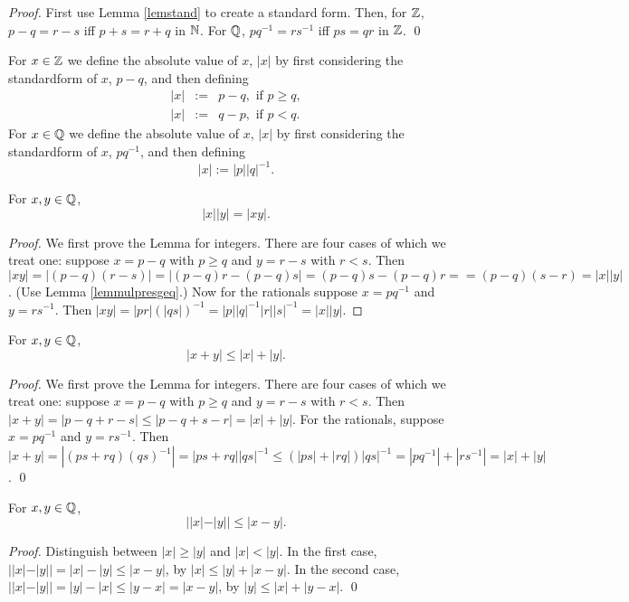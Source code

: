 {\begin{proof}
First use Lemma \ref{lemstand} to create a standard form. Then, for $\mathbb{Z}$,
$p-q = r-s$ iff $p+s = r+q$ in $\mathbb{N}$.
For $\mathbb{Q}$, $p   q^{-1} = r  s^{-1}$ iff $p   s = q   r$ in $\mathbb{Z}$. \qed
\end{proof}

\begin{definition}\label{defabszq}
For $x\in\mathbb{Z}$ we define the absolute value of $x$, $|x|$ by first
considering the standardform of $x$, $p-q$, and then defining
\begin{eqnarray*} 
|x|&:=& p-q, \mbox{ if } p\geq q,\\
|x| &:=& q-p, \mbox{ if } p< q.
\end{eqnarray*}
For $x\in\mathbb{Q}$ we define the absolute value of $x$, $|x|$ by first
considering the standardform of $x$, $p q^{-1}$, and then defining
$$|x|:= |p| |q|^{-1}.$$
\end{definition}

\begin{lemma}\label{lemmulabsval}
For $x, y \in \mathbb{Q}$,
$$ |x| |y| = |xy|.$$
\end{lemma}

\begin{proof}
We first prove the Lemma for integers. There are four cases of which we treat one:
suppose $x = p-q$ with $p\geq q$ and $y= r-s$ with $r<s$. Then $|x y| = |(p-q) (r-s)|
= |(p-q) r -(p-q) s| = (p-q) s - (p-q) r = = (p-q) (s-r) = |x| |y|$. 
(Use Lemma \ref{lemmulpresgeq}.) Now for the rationals suppose $x = p q^{-1}$ and 
$y = r   s^{-1}$. Then $|x   y| = |p r| (|q s|)^{-1} = |p| |q|^{-1} 
|r|   |s|^{-1} = |x| |y|$.
\end{proof}

\begin{lemma}\label{lemtriangle}
For $x, y \in \mathbb{Q}$,
$$|x + y| \leq |x|+|y|.$$
\end{lemma}

\begin{proof}
We first prove the Lemma for integers. There are four cases of which we treat one: 
suppose $x = p-q$ with $p\geq q$ and $y= r-s$ with $r<s$. Then $|x+y| =|p-q+r-s| \leq 
|p-q+s-r| = |x| +|y|$.
For the rationals, suppose $x = p q^{-1}$ and $y = r   s^{-1}$. Then $|x+y| = |(ps + rq) (qs)^{-1}|
=  |ps + rq| |qs|^{-1} \leq (|ps| + |rq|) |qs|^{-1} = |p   q^{-1}| + |r s^{-1}| = 
|x|+|y|$. \qed
\end{proof}

\begin{corollary}\label{corabsq}
For $x, y \in \mathbb{Q}$,
$$||x| - |y|| \leq |x-y|.$$
\end{corollary}

\begin{proof} Distinguish between $|x|\geq |y|$ and $|x|< |y|$. In the
first case, $||x| - |y|| = |x|-|y|\leq |x-y|$, by $|x| \leq
|y|+|x-y|$. In the second case, $||x| - |y|| = |y|-|x|\leq |y-x| =
|x-y|$, by $|y| \leq |x|+|y-x|$. \qed
\end{proof}
}
